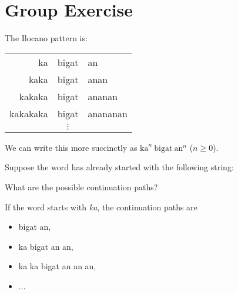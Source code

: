 \section*{Group Exercise}
\thispagestyle{empty}
\noindent
The Ilocano pattern is:
%
\begin{center}
    \begin{tabular}{rcl}
        ka & bigat & an\\
        kaka & bigat & anan\\
        kakaka& bigat & ananan\\
        kakakaka& bigat & anananan\\
        & $\vdots$\\
    \end{tabular}
\end{center}
%
We can write this more succinctly as $\text{ka}^n\ \text{bigat}\ \text{an}^n$ ($n \geq 0$).

\noindent
Suppose the word has already started with the following string:

\vspace{6em}

\noindent
What are the possible continuation paths?

\begin{example}
    If the word starts with \emph{ka}, the continuation paths are
    \begin{itemize}
        \item bigat an,
        \item ka bigat an an,
        \item ka ka bigat an an an,
        \item $\ldots$
    \end{itemize}
\end{example}
